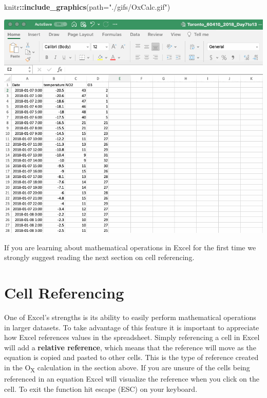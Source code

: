 \documentclass[
]{book}
\newenvironment{Shaded}{\begin{snugshade}}{\end{snugshade}}
\newcommand{\AttributeTok}[1]{\textcolor[rgb]{0.13,0.29,0.53}{#1}}
\newcommand{\FunctionTok}[1]{\textcolor[rgb]{0.13,0.29,0.53}{\textbf{#1}}}
\newcommand{\NormalTok}[1]{#1}
\newcommand{\SpecialCharTok}[1]{\textcolor[rgb]{0.81,0.36,0.00}{\textbf{#1}}}
\newcommand{\StringTok}[1]{\textcolor[rgb]{0.31,0.60,0.02}{#1}}
\begin{document}
\begin{Shaded}
\begin{Highlighting}[]
\NormalTok{knitr}\SpecialCharTok{::}\FunctionTok{include\_graphics}\NormalTok{(}\AttributeTok{path=}\StringTok{"./gifs/OxCalc.gif"}\NormalTok{)}
\end{Highlighting}
\end{Shaded}

\includegraphics{./gifs/OxCalc.gif}

If you are learning about mathematical operations in Excel for the first time we strongly suggest reading the next section on cell referencing.

\hypertarget{cell-referencing}{%
\section{Cell Referencing}\label{cell-referencing}}

One of Excel's strengths is its ability to easily perform mathematical operations in larger datasets. To take advantage of this feature it is important to appreciate how Excel references values in the spreadsheet. Simply referencing a cell in Excel will add a \textbf{relative reference}, which means that the reference will move as the equation is copied and pasted to other cells. This is the type of reference created in the O\textsubscript{X} calculation in the section above. If you are unsure of the cells being referenced in an equation Excel will visualize the reference when you click on the cell. To exit the function hit escape (ESC) on your keyboard.
\end{document}
